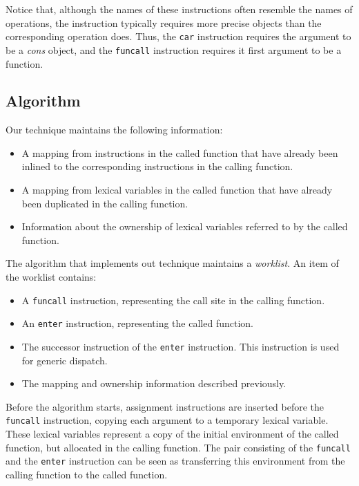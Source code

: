 Notice that, although the names of these instructions often resemble
the names of \commonlisp{} operations, the instruction typically
requires more precise objects than the corresponding \commonlisp{}
operation does.  Thus, the \texttt{car} instruction requires the
argument to be a \emph{cons} object, and the \texttt{funcall}
instruction requires it first argument to be a function.

\subsection{Algorithm}

Our technique maintains the following information:

\begin{itemize}
\item A mapping from instructions in the called function that have
  already been inlined to the corresponding instructions in the
  calling function.
\item A mapping from lexical variables in the called function that
  have already been duplicated in the calling function.
\item Information about the ownership of lexical variables referred to
  by the called function.
\end{itemize}

The algorithm that implements out technique maintains a
\emph{worklist}.  An item of the worklist contains:

\begin{itemize}
\item A \texttt{funcall} instruction, representing the call site in the
  calling function.
\item An \texttt{enter} instruction, representing the called function.
\item The successor instruction of the \texttt{enter} instruction.
  This instruction is used for generic dispatch.
\item The mapping and ownership information described previously.
\end{itemize}

Before the algorithm starts, assignment instructions are inserted
before the \texttt{funcall} instruction, copying each argument to a
temporary lexical variable.  These lexical variables represent a copy
of the initial environment of the called function, but allocated in
the calling function.  The pair consisting of the \texttt{funcall} and
the \texttt{enter} instruction can be seen as transferring this
environment from the calling function to the called function.


